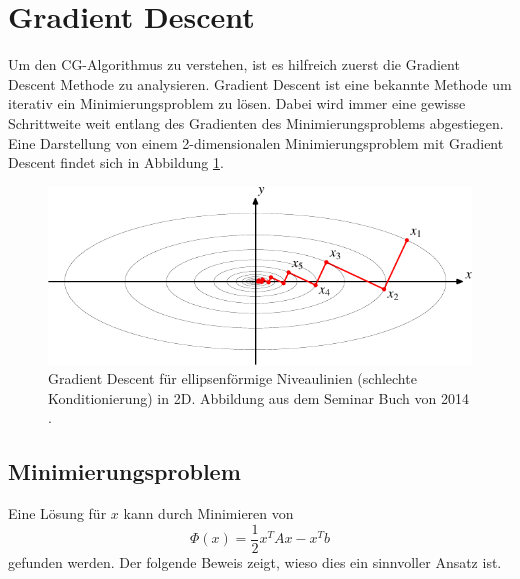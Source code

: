 %
%
%
\section{Gradient Descent\label{cg:section:steepest_descent}}

Um den CG-Algorithmus zu verstehen, ist es hilfreich zuerst die Gradient Descent Methode zu analysieren.
Gradient Descent ist eine bekannte Methode um iterativ ein Minimierungsproblem zu lösen.
Dabei wird immer eine gewisse Schrittweite weit entlang des Gradienten des Minimierungsproblems abgestiegen.
Eine Darstellung von einem 2-dimensionalen Minimierungsproblem mit Gradient Descent findet sich in Abbildung \ref{cg:abb:steepest_descent}.

\begin{figure}	
	\centering
	\includegraphics{papers/cg/images/descent-1}
	\caption{Gradient Descent für ellipsenförmige Niveaulinien (schlechte Konditionierung) in 2D. 
		Abbildung aus dem Seminar Buch von 2014 \cite{cg:book:hpc}.}
	\label{cg:abb:steepest_descent}
\end{figure}

\subsection{Minimierungsproblem \label{cg:subsection:Minimierungsproblem}}

Eine Lösung für $x$ kann durch Minimieren von
\begin{equation}
\Phi(x) = \frac{1}{2} x^T A x - x^T b
\end{equation}
gefunden werden.
Der folgende Beweis zeigt, wieso dies ein sinnvoller Ansatz ist.


